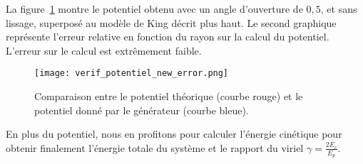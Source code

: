 			La figure~\ref{potentiel_5000} montre le potentiel obtenu avec un angle d'ouverture de $0,5$, et sans lissage, superposé au
			modèle de King décrit plus haut. Le second graphique représente l'erreur relative en fonction du rayon sur la calcul du
			potentiel. L'erreur sur le calcul est extrêmement faible.
			\begin{figure}[htbp]
				\centering \texttt{[image: verif\_potentiel\_new\_error.png]}
				\caption{Comparaison entre le potentiel théorique (courbe rouge) et le potentiel donné par le
					générateur (courbe bleue)\label{potentiel_5000}.}
			\end{figure}

			En plus du potentiel, nous en profitons pour calculer l'énergie cinétique pour obtenir finalement
			l'énergie totale du système et le rapport du viriel $\gamma = \frac{2E_c}{E_p}$.



